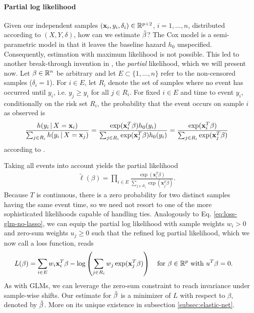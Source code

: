 \paragraph{Partial log likelihood}
Given our independent samples $(\mathbf{x}_i, y_i, \delta_i) \in \mathbb{R}^{p+2}$, $i = 1, \ldots, n$, distributed 
according to $(X, Y, \delta)$, how can we estimate $\tilde{\beta}$? The Cox model is a semi-parametric 
model in that it leaves the baseline hazard $h_0$ unspecified. Consequently, estimation with maximum 
likelihood is not possible. This led to another break-through invention in \cite{cox72}, the 
\textit{partial} likelihood, which we will present now. Let $\beta \in \mathbb{R}^n$ be arbitrary and let 
$E \subset \{ 1, \ldots, n \}$ refer to the non-censored samples ($\delta_i = 1$). For $i \in E$, 
let $R_i$ denote the set of samples 
where no event has occurred until $y_i$, i.e. $y_j \geq y_i$ for all $j \in R_i$. For
fixed $i \in E$ and time to event $y_i$, conditionally on the risk set $R_i$, the probability that 
the event occurs on sample $i$ as observed is
\begin{align}
    \frac{h(y_i \,|\, X = \mathbf{x}_i)}{\sum_{j \in R_i} h(y_i \,|\, X = \mathbf{x}_j)} = 
    \frac{\exp(\mathbf{x}_i^T \beta) h_0(y_i)}{\sum_{j \in R_i} \exp(\mathbf{x}_j^T \beta) h_0(y_i)} = 
    \frac{\exp(\mathbf{x}_i^T \beta)}{\sum_{j \in R_i} \exp(\mathbf{x}_j^T \beta)}
\end{align}
according to \cite[Eq. (12)]{cox72}.

Taking all events into account yields the partial likelihood 
\begin{align}\label{eq:cox-partial-lh}
    \tilde{\ell}(\beta) = \prod_{i \in E} \frac{\exp(\mathbf{x}_i^T \beta)}{\sum_{j \in R_i} \exp(\mathbf{x}_j^T 
    \beta)}.
\end{align}
Because $T$ is continuous, there is a zero probability for two distinct samples having the same 
event time, so we need not resort to one of the more sophisticated likelihoods capable of handling ties.
Analogously to Eq. \eqref{eq:loss-glm-no-lasso}, we can equip the partial log likelihood with sample 
weights $w_i > 0$ and zero-sum weights $u_j \geq 0$ such that the refined log partial likelihood, 
which we now call a loss function, reads 
\begin{align}\label{eq:cox-loss}
\begin{split}
    L(\beta) &= \sum_{i \in E} w_i \mathbf{x}_i^T \beta - \log \left( \sum_{j \in R_i} w_j \exp(\mathbf{x}_j^T
    \beta) \right) \quad \text{for } \beta \in \mathbb{R}^p \text{ with } u^T \beta = 0.
\end{split}
\end{align}
As with GLMs, we can leverage the zero-sum constraint to reach invariance under sample-wise shifts. 
Our estimate for $\tilde{\beta}$ is a minimizer of $L$ with respect to $\beta$, denoted by $\hat{\beta}$. 
More on its unique existence in subsection \ref{subsec:elastic-net}.

